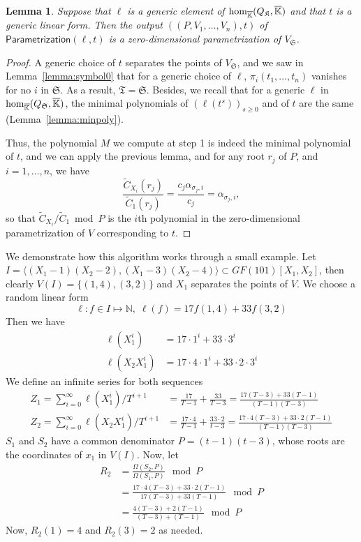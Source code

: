 \documentclass[12pt]{article}
\newtheorem{Lemma}{Lemma}
\def\Kbar {{\ensuremath{\overline{\mathbb{K}}}}}
\begin{document}
\begin{Lemma}
	Suppose that $\ell$ is a generic element of ${\rm
		hom}_{\Kbar}(Q_\mathfrak{K},\Kbar)$ and that $t$ is a generic
	linear form. Then the output $((P,V_1,\dots,V_n),t)$ of
	$\mathsf{Parametrization}(\ell,t)$ is a zero-dimensional
	parametrization of $V_{\mathfrak{S}}$.
\end{Lemma}
\begin{proof}
	A generic choice of $t$ separates the points of $V_{\mathfrak{S}}$,
	and we saw in Lemma~\ref{lemma:symbol0} that for a generic choice of
	$\ell$, $\pi_i(t_1,\dots,t_n)$ vanishes for no $i$ in
	$\mathfrak{S}$.  As a result, $\mathfrak{T}=\mathfrak{S}$.  Besides,
	we recall that for a generic $\ell$ in ${\rm
		hom}_{\Kbar}(Q_\mathfrak{S},\Kbar)$, the minimal polynomials of
	$(\ell(t^s))_{s \ge 0}$ and of $t$ are the same
	(Lemma~\ref{lemma:minpoly}).
	
	Thus, the polynomial $M$ we compute at step 1 is indeed the minimal
	polynomial of $t$, and we can apply the previous lemma, and for 
	any root $r_j$ of $P$, and $i=1,\dots,n$, we have
	$$\frac{\tilde C_{X_i}(r_j)}{\tilde C_1(r_j)}  = \frac{c_j \alpha_{\sigma_j,i}}{c_j} = \alpha_{\sigma_j,i},$$
	so that $\tilde C_{X_i}/\tilde C_1 \bmod P$ is the $i$th polynomial in
	the zero-dimensional parametrization of $V$ corresponding to $t$.
\end{proof}

We demonstrate how this algorithm works through a small example. Let 
$I = \langle (X_1-1)(X_2-2),(X_1-3)(X_2-4)\rangle \subset
GF(101)[X_1,X_2]$, then
clearly $V(I) = \{ (1,4),(3,2) \}$ and $X_1$ separates the
points of $V$. We choose a random linear form 
$$\ell: f \in I \mapsto \mathbb{N},\;\ell(f) = 17 f(1,4) + 33 f(3,2)$$
Then we have
\begin{align*}
\ell(X_1^i) &= 17 \cdot 1^i + 33 \cdot 3^i\\
\ell(X_2X_1^i) &= 17 \cdot 4 \cdot 1^i + 33 \cdot 2 \cdot 3^i
\end{align*} 
We define an infinite series for both sequences
\begin{align*}
Z_1 = \sum_{i = 0}^{\infty} \ell(X^i_1) / T^{i+1}
&= \frac{17}{T-1} + \frac{33}{T-3}
= \frac{17(T-3)+33(T-1)}{(T-1)(T-3)} \\
Z_2 = \sum_{i=0}^{\infty} \ell(X_2X^i_1)/T^{i+1} 
&= \frac{17\cdot 4}{T-1} + \frac{33 \cdot 2}{t-3}
= \frac{17\cdot 4 (T-3) + 33\cdot 2(T-1)}{(T-1)(T-3)}
\end{align*}
$S_1$ and $S_2$ have a common denominator $P = (t-1)(t-3)$,
whose roots are the coordinates of $x_1$ in $V(I)$. Now, let
\begin{align*}
R_2 
&=\frac{\Omega(S_2,P)}{\Omega(S_1,P)} \mod P\\
&= 
\frac{17\cdot 4 (T-3) + 33\cdot 2(T-1)}{17(T-3)+33(T-1)} \mod P\\
&=\frac{4 (T-3) + 2(T-1)}{(T-3)+(T-1)} \mod P
\end{align*}
Now, $ R_2(1) = 4$ and $R_2(3) = 2$ as needed.
\end{document}
